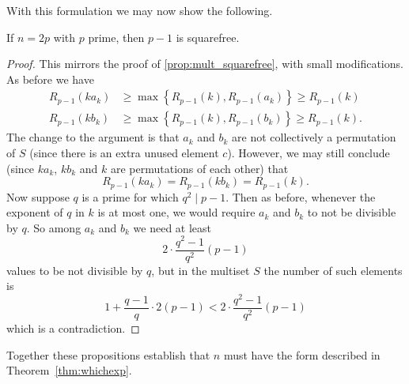 With this formulation we may now show the following.
\begin{proposition}
	If $n = 2p$ with $p$ prime, then $p-1$ is squarefree.
\end{proposition}
\begin{proof}
	This mirrors the proof of \ref{prop:mult_squarefree},
	with small modifications.
	As before we have
	\begin{align*}
		R_{p-1}\left( ka_k \right)
			&\ge \max \left\{ R_{p-1}(k), R_{p-1}(a_k) \right\}
			\ge R_{p-1}(k) \\
		R_{p-1}\left( kb_k \right)
			&\ge \max \left\{ R_{p-1}(k), R_{p-1}(b_k) \right\}
			\ge R_{p-1}(k).
	\end{align*}
	The change to the argument is that
	$a_k$ and $b_k$ are not collectively a permutation of $S$
	(since there is an extra unused element $c$).
	However, we may still conclude
	(since $ka_k$, $kb_k$ and $k$ are permutations of each other)
	that
	\[ R_{p-1}(ka_k) = R_{p-1}(kb_k) = R_{p-1}(k). \]
	Now suppose $q$ is a prime for which $q^2 \mid p-1$.
	Then as before, whenever the exponent of $q$ in $k$ is at most one,
	we would require $a_k$ and $b_k$ to not be divisible by $q$.
	So among $a_k$ and $b_k$ we need at least
	\[ 2 \cdot \frac{q^2-1}{q^2} (p-1) \]
	values to be not divisible by $q$,
	but in the multiset $S$ the number of such elements is
	\[ 1 + \frac{q-1}{q} \cdot 2(p-1)
		< 2 \cdot \frac{q^2-1}{q^2} (p-1) \]
	which is a contradiction.
\end{proof}

Together these propositions establish that $n$
must have the form described in Theorem~\ref{thm:whichexp}.
